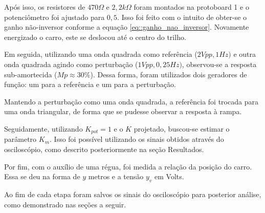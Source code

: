 Após isso, os resistores de $470\Omega$ e $2,2k\Omega$ foram montados na protoboard 1 e o potenciômetro foi ajustado para $0,5$. Isso foi feito com o intuito de obter-se o ganho não-inversor conforme a equação \ref{eq::ganho_nao_inversor}. Novamente energizado o carro, este se deslocou até o centro do trilho.

Em seguida, utilizando uma onda quadrada como referência ($2Vpp, 1 Hz)$ e outra onda quadrada agindo como perturbação ($ 1Vpp, 0,25 Hz)$, observou-se a resposta sub-amortecida ($Mp \approx 30\%$). Dessa forma, foram utilizados dois geradores de função: um para a referência e um para a perturbação. 

Mantendo a perturbação como uma onda quadrada, a referência foi trocada para uma onda triangular, de forma que se pudesse observar a resposta à rampa. 

Seguidamente, utilizando $K_{pot}= 1$ e o $K$ projetado, buscou-se estimar o parâmetro $K_m$. Isso foi possível utilizando os sinais obtidos através do osciloscópio, como descrito posteriormente na seção Resultados.

Por fim, com o auxílio de uma régua, foi medida a relação da posição do carro. Essa se deu na forma de $y$ metros e a tensão $y_v$ em Volts.

Ao fim de cada etapa foram salvos os sinais do osciloscópio para posterior análise, como demonstrado nas seções a seguir.



